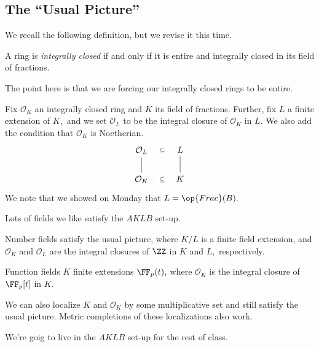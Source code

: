 








\subsection{The ``Usual Picture''}
We recall the following definition, but we revise it this time.
\begin{defi}
    A ring is \textit{integrally closed} if and only if it is entire and integrally closed in its field of fractions.
\end{defi}
The point here is that we are forcing our integrally closed rings to be entire.
\begin{defi}
    Fix $\mathcal O_K$ an integrally closed ring and $K$ its field of fractions. Further, fix $L$ a finite extension of $K,$ and we set $\mathcal O_L$ to be the integral closure of $\mathcal O_K$ in $L.$ We also add the condition that $\mathcal O_K$ is Noetherian.
    \[\begin{tikzcd}
    	\mathcal O_L & L \\
    	\mathcal O_K & K
    	\arrow[no head, from=2-2, to=1-2]
    	\arrow[no head, from=2-1, to=1-1]
    	\arrow["\subseteq"{description}, draw=none, from=2-1, to=2-2]
    	\arrow["\subseteq"{description}, draw=none, from=1-1, to=1-2]
    \end{tikzcd}\]
    We note that we showed on Monday that $L=\op{Frac}(B).$
\end{defi}
Lots of fields we like satisfy the $AKLB$ set-up.
\begin{ex}
    Number fields satisfy the usual picture, where $K/L$ is a finite field extension, and $\mathcal O_K$ and $\mathcal O_L$ are the integral closures of $\ZZ$ in $K$ and $L,$ respectively.
\end{ex}
\begin{ex}
    Function fields $K$ finite extensions $\FF_p(t),$ where $\mathcal O_K$ is the integral closure of $\FF_p[t]$ in $K.$
\end{ex}
\begin{ex}
    We can also localize $K$ and $\mathcal O_K$ by some multiplicative set and still satisfy the usual picture. Metric completions of these localizations also work.
\end{ex}
We're goig to live in the $AKLB$ set-up for the rest of class.

